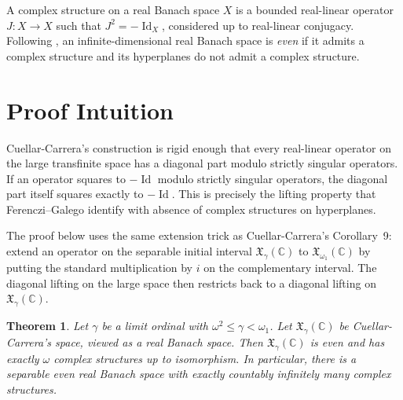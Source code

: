 \documentclass[11pt]{article}
\newtheorem{theorem}{Theorem}
\newcommand{\C}{\mathbb C}
\newcommand{\X}{\mathfrak X}
\newcommand{\Id}{\operatorname{Id}}
\begin{document}
A complex structure on a real Banach space $X$ is a bounded real-linear
operator $J\colon X\to X$ such that $J^2=-\Id_X$, considered up to
real-linear conjugacy.  Following \cite{FG}, an infinite-dimensional
real Banach space is \emph{even} if it admits a complex structure and
its hyperplanes do not admit a complex structure.

\section*{Proof Intuition}

Cuellar-Carrera's construction is rigid enough that every real-linear
operator on the large transfinite space has a diagonal part modulo
strictly singular operators.  If an operator squares to $-\Id$ modulo
strictly singular operators, the diagonal part itself squares exactly to
$-\Id$.  This is precisely the lifting property that Ferenczi--Galego
identify with absence of complex structures on hyperplanes.

The proof below uses the same extension trick as Cuellar-Carrera's
Corollary~9: extend an operator on the separable initial interval
$\X_\gamma(\C)$ to $\X_{\omega_1}(\C)$ by putting the standard
multiplication by $i$ on the complementary interval.  The diagonal
lifting on the large space then restricts back to a diagonal lifting on
$\X_\gamma(\C)$.

\begin{theorem}
Let $\gamma$ be a limit ordinal with $\omega^2\leq \gamma<\omega_1$.
Let $\X_\gamma(\C)$ be Cuellar-Carrera's space, viewed as a real Banach
space.  Then $\X_\gamma(\C)$ is even and has exactly $\omega$ complex
structures up to isomorphism.  In particular, there is a separable even
real Banach space with exactly countably infinitely many complex
structures.
\end{theorem}
\end{document}
